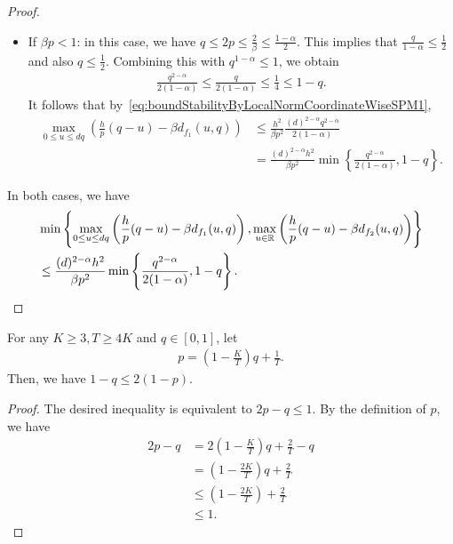 \begin{proof}
\begin{itemize}
        \item If $\beta p < 1$: in this case, we have $q \leq 2p \leq \frac{2}{\beta} \leq \frac{1-\alpha}{2}$. This implies that $\frac{q}{1-\alpha} \leq \frac{1}{2}$ and also $q \leq \frac{1}{2}$.
        Combining this with $q^{1-\alpha} \leq 1$, we obtain
        \begin{align*}
            \frac{q^{2-\alpha}}{2(1-\alpha)} \leq \frac{q}{2(1-\alpha)} \leq \frac{1}{4} \leq 1-q.
        \end{align*}
        It follows that by~\eqref{eq:boundStabilityByLocalNormCoordinateWiseSPM1},
        \begin{align*}
            \max_{0 \leq u \leq dq}\left(\frac{h}{p}(q - u) - \beta d_{f_1}(u, q)\right) &\leq \frac{h^2}{\beta p^2} \frac{(d)^{2-\alpha} q^{2-\alpha}}{2(1-\alpha)} \\
            &= \frac{(d)^{2-\alpha} h^2}{\beta p^2} \min\left\{ \frac{ q^{2-\alpha}}{2(1-\alpha)}, 1-q \right\}.
        \end{align*}
    \end{itemize}
    In both cases, we have
    \begin{align*}
        &\min\left\{ \max_{0 \leq u \leq dq}\left(\frac{h}{p}(q - u) - \beta d_{f_1}(u, q)\right), \max_{u \in \mathbb{R}}\left(\frac{h}{p}(q - u) - \beta d_{f_2}(u, q)\right) \right\} \\
        &\leq \frac{(d)^{2-\alpha}h^2}{\beta p^2} \min\left\{ \frac{q^{2-\alpha}}{2(1-\alpha)}, 1-q \right\}.
    \end{align*}
\end{proof}

\begin{lemma}
    For any $K \geq 3, T \geq 4K$ and $q \in [0,1]$, let 
    \begin{align*}
        p = \left(1 - \frac{K}{T}\right)q + \frac{1}{T}.
    \end{align*}
    Then, we have $1-q \leq 2(1-p)$. 
    \label{lemma:1minusqByTwoTimes1minusp}
\end{lemma}
\begin{proof}
    The desired inequality is equivalent to $2p - q \leq 1$. By the definition of $p$, we have
    \begin{align*}
        2p - q &= 2\left(1 - \frac{K}{T}\right)q + \frac{2}{T} - q \\
        &= \left(1 - \frac{2K}{T}\right)q + \frac{2}{T} \\
        &\leq \left(1 - \frac{2K}{T}\right) + \frac{2}{T} \\
        &\leq 1.
    \end{align*}
\end{proof}

